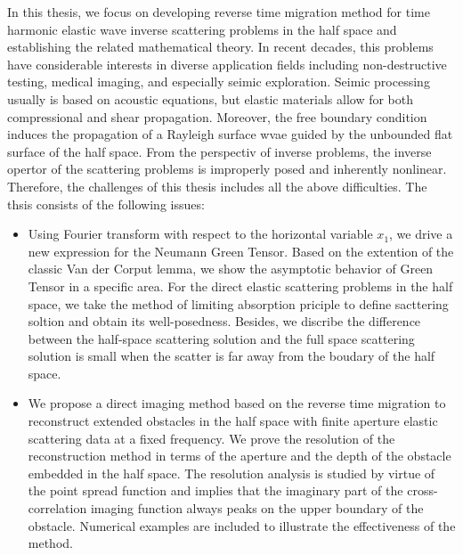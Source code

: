 In this thesis, we focus on developing reverse time migration method for time harmonic elastic wave inverse scattering problems in the half space and establishing the related mathematical theory. In recent decades, this problems have considerable interests in diverse application fields including non-destructive testing, medical imaging, and especially seimic exploration.
Seimic processing
 usually is based on acoustic equations, but elastic materials allow for both compressional and shear propagation. Moreover, the free boundary condition induces the propagation of a Rayleigh surface wvae guided by the unbounded flat surface of the half space. From the perspectiv of inverse problems, the inverse opertor of the scattering problems is improperly posed and inherently nonlinear. Therefore, the challenges of this thesis includes all the above difficulties. The thsis consists of the following issues:
\begin{itemize}
	\item Using Fourier transform with respect to the horizontal variable $x_1$, we drive a new expression for the Neumann Green Tensor. Based on the extention of the classic Van der Corput lemma, we show the asymptotic behavior of Green Tensor in a specific area. For the direct elastic scattering problems in the half space, we take the method of limiting absorption priciple to define  sacttering soltion and obtain its well-posedness. Besides, we discribe the difference between the half-space scattering solution and the full space scattering solution is small when the scatter is far away from the boudary of the half space.
	
	
	\item We propose a direct imaging method based on the reverse time migration to reconstruct extended
	obstacles in the half space with finite aperture elastic scattering data at a fixed
	frequency. We prove the resolution of the reconstruction method in terms of the
	aperture and the depth of the obstacle embedded in the half space. The resolution
	analysis is studied by virtue of the point spread function and implies that the imaginary 
	part of the cross-correlation imaging function
	always peaks on the upper boundary of the obstacle. Numerical examples
	are included to illustrate the effectiveness of the method. 
\end{itemize}
	


